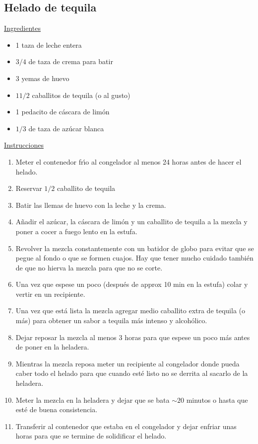 \subsection{Helado de tequila}
\underline{Ingredientes}
\begin{itemize}
\item 1 taza de leche entera
\item $3/4$ de taza de crema para batir
\item 3 yemas de huevo
\item $1 1/2$ caballitos de tequila (o al gusto)
\item 1 pedacito de c\'ascara de lim\'on
\item $1/3$ de taza de az\'ucar blanca

\end{itemize}

\underline{Instrucciones}

\begin{enumerate}
\item Meter el contenedor fr\'{\i}o al congelador al menos 24 horas antes de hacer el helado.
\item Reservar $1/2$ caballito de tequila
\item Batir las llemas de huevo con la leche y la crema.
\item Añadir el az\'ucar, la c\'ascara de lim\'on y un caballito de tequila a la mezcla y poner a cocer a fuego lento en la estufa. 
\item Revolver la mezcla constantemente con un batidor de globo para evitar que se pegue al fondo o que se formen cuajos. Hay que tener mucho cuidado tambi\'en de que no hierva la mezcla para que no se corte. 
\item Una vez que espese un poco (despu\'es de approx 10 min en la estufa) colar y vertir en un recipiente.
\item Una vez que est\'a lista la mezcla agregar medio caballito extra de tequila (o m\'as) para obtener un sabor a tequila m\'as intenso y alcoh\'olico.
\item Dejar reposar la mezcla al menos 3 horas para que espese un poco m\'as antes de poner en la heladera. 
\item Mientras la mezcla reposa meter un recipiente al congelador donde pueda caber todo el helado para que cuando est\'e listo no se derrita al sacarlo de la heladera.
\item Meter la mezcla en la heladera y dejar que se bata $\sim20$ minutos o hasta que est\'e de buena consistencia.
\item Transferir al contenedor que estaba en el congelador y dejar enfriar unas horas para que se termine de solidificar el helado. 

\end{enumerate}
